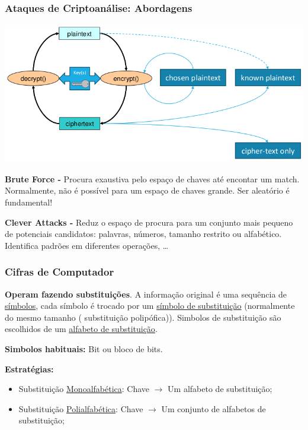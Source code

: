 \documentclass{article}
\begin{document}
\subsubsection{Ataques de Criptoanálise: Abordagens}

\begin{center}
  \includegraphics[scale=0.3]{69}
\end{center}

\begin{flushleft}
  \textbf{Brute Force -} Procura exaustiva pelo espaço de chaves até encontar
  um match. Normalmente, não é possível para um espaço de chaves grande. Ser
  aleatório é fundamental!

  \vspace{2mm}

  \textbf{Clever Attacks -} Reduz o espaço de procura para um conjunto mais pequeno
  de potenciais candidatos: palavras, números, tamanho restrito ou alfabético.
  Identifica padrões em diferentes operações, \dots
\end{flushleft}

\subsubsection{Cifras de Computador}

\begin{flushleft}
  \textbf{Operam fazendo substituições}. A informação original é uma sequência de
  \uline{símbolos}, cada símbolo é trocado por um \uline{símbolo de substituição} (normalmente do mesmo tamanho (
    substituição polipófica)). Simbolos de substituição são escolhidos de um \uline{alfabeto
    de substituição}.

  \vspace{2mm}

  \textbf{Simbolos habituais:} Bit ou bloco de bits.

  \vspace{2mm}

  \textbf{Estratégias:}
  \begin{itemize}
    \item Substituição \uline{Monoalfabética}: Chave $\rightarrow$ Um alfabeto de substituição;
    \item Substituição \uline{Polialfabética}: Chave $\rightarrow$ Um conjunto de alfabetos de substituição; 
  \end{itemize}
\end{flushleft}
\end{document}
